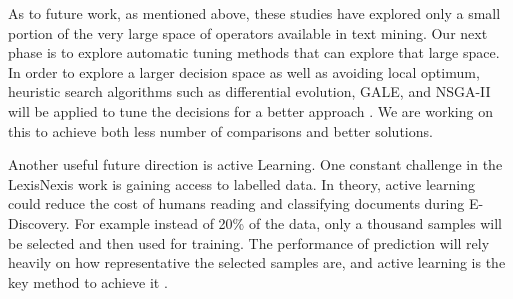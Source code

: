 \documentclass{sig-alternate-05-2015}
\theoremstyle{break}
\begin{document}
As to future work, as mentioned  above, these studies have  explored only a small portion of the very large space of operators available in text mining.
Our next phase is to explore automatic tuning methods that can explore that large space.
In order to explore a larger decision space as well as avoiding local optimum, heuristic search algorithms such as differential evolution, GALE, and NSGA-II will be applied to tune the decisions for a better approach \cite{storn1997differential,krall2015gale,deb2002fast}. We are working on this to achieve both less number of comparisons and better solutions.

Another useful future direction is
active Learning.
One constant challenge in the LexisNexis work is gaining access to labelled data. In theory,
active learning could reduce the cost of humans reading and classifying documents during E-Discovery.
For example  instead of 20\% of the data, only a thousand samples will be selected and then used for training. The performance of prediction will rely heavily on how representative the selected samples are, and active learning is the key method to achieve it \cite{tong2002support}. 









 

%
 \renewcommand{\baselinestretch}{0.9}
 
\balance

\small

\renewcommand{\baselinestretch}{1}

%
%
\end{document}
